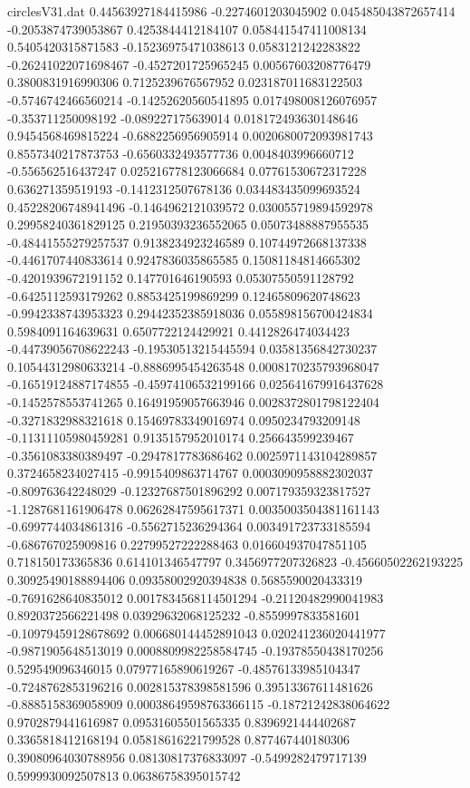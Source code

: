 \begin{filecontents}{circlesV31.dat}
0.44563927184415986	-0.2274601203045902	0.045485043872657414
-0.2053874739053867	0.4253844412184107	0.058441547411008134
0.5405420315871583	-0.15236975471038613	0.0583121242283822
-0.26241022071698467	-0.4527201725965245	0.00567603208776479
0.3800831916990306	0.7125239676567952	0.023187011683122503
-0.5746742466560214	-0.14252620560541895	0.017498008126076957
-0.353711250098192	-0.089227175639014	0.018172493630148646
0.9454568469815224	-0.6882256956905914	0.0020680072093981743
0.8557340217873753	-0.6560332493577736	0.0048403996660712
-0.556562516437247	0.025216778123066684	0.07761530672317228
0.636271359519193	-0.1412312507678136	0.034483435099693524
0.45228206748941496	-0.1464962121039572	0.030055719894592978
0.29958240361829125	0.21950393236552065	0.05073488887955535
-0.48441555279257537	0.9138234923246589	0.10744972668137338
-0.4461707440833614	0.9247836035865585	0.15081184814665302
-0.4201939672191152	0.147701646190593	0.05307550591128792
-0.6425112593179262	0.8853425199869299	0.12465809620748623
-0.9942338743953323	0.29442352385918036	0.055898156700424834
0.5984091164639631	0.6507722124429921	0.4412826474034423
-0.44739056708622243	-0.19530513215445594	0.03581356842730237
0.10544312980633214	-0.8886995454263548	0.0008170235793968047
-0.16519124887174855	-0.45974106532199166	0.025641679916437628
-0.1452578553741265	0.16491959057663946	0.0028372801798122404
-0.3271832988321618	0.15469783349016974	0.0950234793209148
-0.11311105980459281	0.9135157952010174	0.256643599239467
-0.3561083380389497	-0.2947817783686462	0.0025971143104289857
0.3724658234027415	-0.9915409863714767	0.0003090958882302037
-0.809763642248029	-0.12327687501896292	0.007179359323817527
-1.1287681161906478	0.06262847595617371	0.0035003504381161143
-0.6997744034861316	-0.5562715236294364	0.003491723733185594
-0.686767025909816	0.22799527222288463	0.016604937047851105
0.718150173365836	0.614101346547797	0.3456977207326823
-0.45660502262193225	0.30925490188894406	0.09358002920394838
0.5685590020433319	-0.7691628640835012	0.0017834568114501294
-0.21120482990041983	0.8920372566221498	0.03929632068125232
-0.8559997833581601	-0.10979459128678692	0.006680144452891043
0.020241236020441977	-0.9871905648513019	0.0008809982258584745
-0.19378550438170256	0.529549096346015	0.07977165890619267
-0.48576133985104347	-0.7248762853196216	0.002815378398581596
0.39513367611481626	-0.8885158369058909	0.00038649598763366115
-0.18721242838064622	0.9702879441616987	0.09531605501565335
0.8396921444402687	0.3365818412168194	0.05818616221799528
0.877467440180306	0.39080964030788956	0.08130817376833097
-0.5499282479717139	0.5999930092507813	0.06386758395015742

\end{filecontents}
